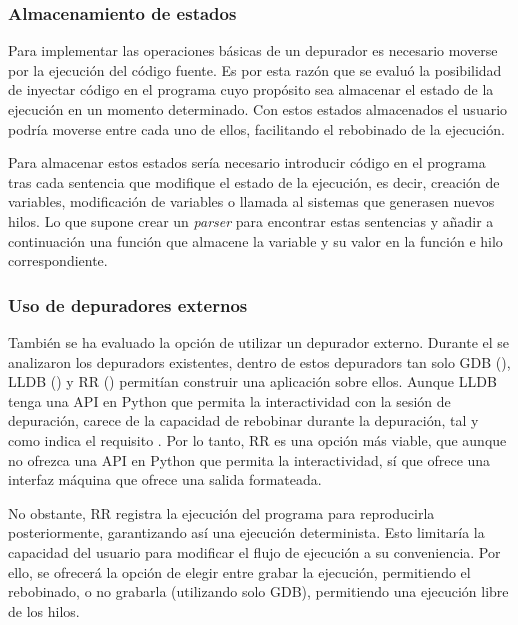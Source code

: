 \subsubsection{Almacenamiento de estados} \label{subsec:almacenamiento-estados}

Para implementar las operaciones básicas de un \gls{depurador} es necesario moverse por la ejecución del \gls{código fuente}. Es por esta razón que se evaluó la posibilidad de \gls{inyectar código} en el programa cuyo propósito sea almacenar el estado de la ejecución en un momento determinado. Con estos estados almacenados el usuario podría moverse entre cada uno de ellos, facilitando el rebobinado de la ejecución.

Para almacenar estos estados sería necesario introducir código en el programa tras cada \gls{sentencia} que modifique el estado de la ejecución, es decir, creación de variables, modificación de variables o \glspl{llamada al sistema} que generasen nuevos \glspl{hilo}. Lo que supone crear un \textit{\gls{parser}} para encontrar estas \glspl{sentencia} y añadir a continuación una función que almacene la variable y su valor en la función e \gls{hilo} correspondiente.


\subsubsection{Uso de depuradores externos} \label{subsec:depuradores-externos}

También se ha evaluado la opción de utilizar un depurador externo. Durante el  se analizaron los \glspl{depurador} existentes, dentro de estos \glspl{depurador} tan solo GDB (), LLDB () y RR () permitían construir una aplicación sobre ellos. Aunque LLDB tenga una \gls{API} en Python que permita la interactividad con la sesión de depuración, carece de la capacidad de rebobinar durante la depuración, tal y como indica el requisito . Por lo tanto, RR es una opción más viable, que aunque no ofrezca una \gls{API} en Python que permita la interactividad, sí que ofrece una interfaz máquina que ofrece una salida formateada.

No obstante, RR registra la ejecución del programa para reproducirla posteriormente, garantizando así una ejecución determinista. Esto limitaría la capacidad del usuario para modificar el flujo de ejecución a su conveniencia. Por ello, se ofrecerá la opción de elegir entre grabar la ejecución, permitiendo el rebobinado, o no grabarla (utilizando solo GDB), permitiendo una ejecución libre de los \glspl{hilo}.

